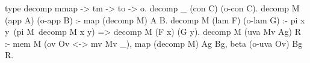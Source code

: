   type decomp mmap -> tm -> to -> o.
  decomp _ (con C)  (o-con C).
  decomp M (app A) (o-app B) :- map (decomp M) A B.
  decomp M (lam F) (o-lam G) :- 
    pi x y\ (pi M\ decomp M x y) => decomp M (F x) (G y).
  decomp M (uva Mv Ag) R :-
    mem M (ov Ov <-> mv Mv _), 
    map (decomp M) Ag Bg,
    beta (o-uva Ov) Bg R.
